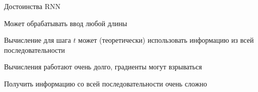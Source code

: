 \documentclass[notes,12pt, aspectratio=169]{beamer}
\newenvironment{transitionframe}{
  \setbeamercolor{background canvas}{bg=yellow}
  \begin{frame}}{
    \end{frame}
}
\newenvironment{wideitemize}{\itemize\addtolength{\itemsep}{10pt}}{\enditemize}
\begin{document}
\begin{frame}{Достоинства RNN}
\begin{wideitemize}
	{\color{green}
	\item  Может обрабатывать ввод любой длины
	\item  Вычисление для шага $t$ может (теоретически) использовать информацию из всей последовательности}
	{\color{red}	
	\item Вычисления работают очень долго, градиенты могут взрываться
	\item Получить информацию со всей последовательности очень сложно}
\end{wideitemize}
\end{frame}



%
%
%
%
%
%
\end{document}
